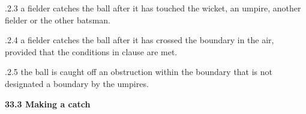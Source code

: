 \documentclass[12pt]{article}
\begin{document}
\vspace{\baselineskip}
\begin{adjustwidth}{1.18in}{0.11in}
{\fontsize{9pt}{10.8pt}.2.3 \tabto{1.17in} a fielder catches the ball after it has touched the wicket, an umpire, another fielder or the other batsman.\par}\par

\end{adjustwidth}


\vspace{\baselineskip}
\begin{adjustwidth}{1.18in}{0.01in}
{\fontsize{9pt}{10.8pt}.2.4 \tabto{1.17in} a fielder catches the ball after it has crossed the boundary in the air, provided that the conditions in clause are met.\par}\par

\end{adjustwidth}


\vspace{\baselineskip}
\begin{adjustwidth}{1.18in}{0.01in}
{\fontsize{9pt}{10.8pt}.2.5 \tabto{1.17in} the ball is caught off an obstruction within the boundary that is not designated a boundary by the umpires.\par}\par

\end{adjustwidth}


\vspace{\baselineskip}

\vspace{\baselineskip}

\vspace{\baselineskip}

\vspace{\baselineskip}

\vspace{\baselineskip}
\begin{Center}
{\fontsize{8pt}{9.6pt}\par}
\end{Center}\par


\vspace{\baselineskip}
{\fontsize{11pt}{13.2pt}\selectfont \textbf{33.3 \tabto{0.47in} Making a catch}\par}\par
\end{document}
